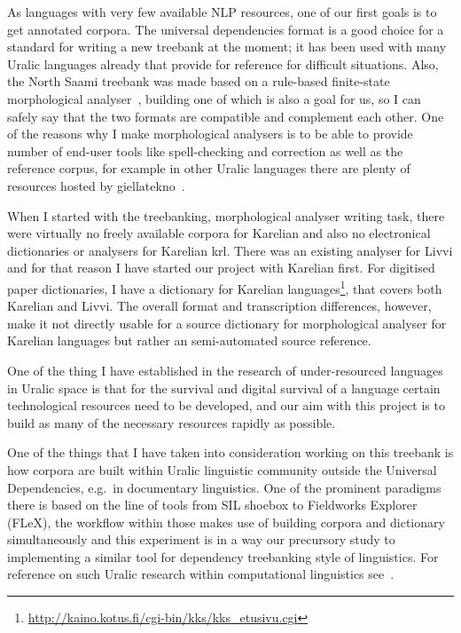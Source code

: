 \documentclass{flammie}
\begin{document}
As languages with very few available NLP resources, one of our first goals is to
get annotated corpora. The universal dependencies format is a good choice for a
standard for writing a new treebank at the moment; it has been used with many
Uralic languages already that provide for reference for difficult situations.
Also, the North Saami treebank was made based on a rule-based finite-state
morphological analyser~\cite{sheyanova2017annotation}, building one of which is
also a goal for us, so I can safely say that the two formats are compatible and
complement each other.  One of the reasons why  I make morphological analysers
is to be able to provide number of end-user tools like spell-checking and
correction as well as the reference corpus, for example in other Uralic
languages there are plenty of resources hosted by
giellatekno~\cite{moshagen2014open}.

When I started with the treebanking, morphological analyser writing task, there
were virtually no freely available corpora for Karelian and also no electronical
dictionaries or analysers for Karelian krl. There was an existing analyser for
Livvi and for that reason I have started our project with Karelian first. For
digitised paper dictionaries, I have a dictionary for Karelian
languages\footnote{\url{http://kaino.kotus.fi/cgi-bin/kks/kks_etusivu.cgi}},
that covers both Karelian and Livvi. The overall format and transcription
differences, however, make it not directly usable for a source dictionary for
morphological analyser for Karelian languages but rather an semi-automated
source reference.

One of the thing I have established in the research of under-resourced
languages in Uralic space is that for the survival and digital survival of
a language certain technological resources need to be developed, and our
aim with this project is to build as many of the necessary resources rapidly as
possible.

One of the things that I have taken into consideration working on this
treebank is how corpora are built within Uralic linguistic community
outside the Universal Dependencies, e.g.\ in documentary linguistics.
One of the prominent paradigms there is based on the line of tools
from SIL shoebox to Fieldworks Explorer (FLeX), the workflow within
those makes use of building corpora and dictionary simultaneously
and this experiment is in a way our precursory study to implementing
a similar tool for dependency treebanking style of linguistics. For reference on
such Uralic research within computational linguistics
see~\cite{blokland2015language}.
\end{document}
